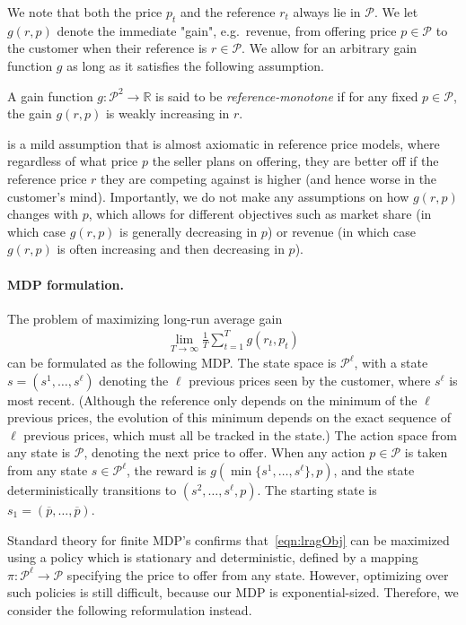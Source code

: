 \documentclass[format=acmsmall, review=false]{acmart}
\newcommand{\bR}{\mathbb{R}}
\newcommand{\cP}{\mathcal{P}}
\newcommand{\op}{\overline{p}}
\begin{document}
We note that both the price $p_t$ and the reference $r_t$ always lie in $\cP$.
We let $g(r,p)$ denote the immediate "gain", e.g.\ revenue, from offering price $p\in\cP$ to the customer when their reference is $r\in\cP$.
We allow for an arbitrary gain function $g$ as long as it satisfies the following assumption.

\begin{definition} \label{def:refMon}
A gain function $g:\cP^2\to\bR$ is said to be \textit{reference-monotone} if for any fixed $p\in\cP$, the gain $g(r,p)$ is weakly increasing in $r$.
\end{definition}

 is a mild assumption that is almost axiomatic in reference price models, where regardless of what price $p$ the seller plans on offering, they are better off if the reference price $r$ they are competing against is higher (and hence worse in the customer's mind).
Importantly, we do not make any assumptions on how $g(r,p)$ changes with $p$, which allows for different objectives such as market share (in which case $g(r,p)$ is generally decreasing in $p$) or revenue (in which case $g(r,p)$ is often increasing and then decreasing in $p$).

\paragraph{MDP formulation.}
The problem of maximizing long-run average gain
\begin{align} \label{eqn:lragObj}
\lim_{T\to\infty}\frac1T\sum_{t=1}^T g(r_t,p_t)
\end{align}
can be formulated as the following MDP.
The state space is $\cP^\ell$, with a state $s=(s^1,\ldots,s^\ell)$ denoting the $\ell$ previous prices seen by the customer, where $s^\ell$ is most recent.
(Although the reference only depends on the minimum of the $\ell$ previous prices, the evolution of this minimum depends on the exact sequence of $\ell$ previous prices, which must all be tracked in the state.)
The action space from any state is $\cP$, denoting the next price to offer.
When any action $p\in\cP$ is taken from any state $s\in\cP^\ell$, the reward is $g(\min\{s^1,\ldots,s^\ell\},p)$, and the state deterministically transitions to $(s^2,\ldots,s^{\ell},p)$.
The starting state is $s_1=(\op,\ldots,\op)$.

Standard theory for finite MDP's \citep{puterman2014markov} confirms that~\eqref{eqn:lragObj} can be maximized using a policy which is stationary and deterministic, defined by a mapping $\pi:\cP^\ell\to\cP$ specifying the price to offer from any state.
However, optimizing over such policies is still difficult, because our MDP is exponential-sized.  Therefore, we consider the following reformulation instead.
\end{document}
